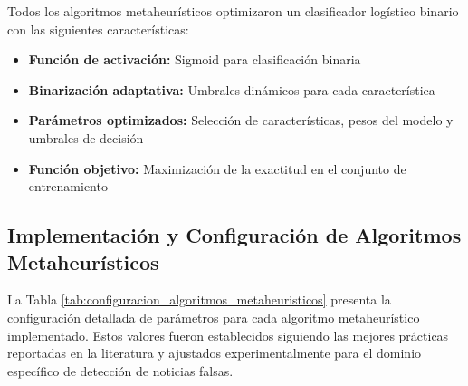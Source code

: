 Todos los algoritmos metaheurísticos optimizaron un clasificador logístico binario con las siguientes características:

\begin{itemize}
    \item \textbf{Función de activación:} Sigmoid para clasificación binaria
    \item \textbf{Binarización adaptativa:} Umbrales dinámicos para cada característica
    \item \textbf{Parámetros optimizados:} Selección de características, pesos del modelo y umbrales de decisión
    \item \textbf{Función objetivo:} Maximización de la exactitud en el conjunto de entrenamiento
\end{itemize}

\subsection{Implementación y Configuración de Algoritmos Metaheurísticos}
\label{subsec:implementacion_algoritmos}

La Tabla \ref{tab:configuracion_algoritmos_metaheuristicos} presenta la configuración detallada de parámetros para cada algoritmo metaheurístico implementado. Estos valores fueron establecidos siguiendo las mejores prácticas reportadas en la literatura y ajustados experimentalmente para el dominio específico de detección de noticias falsas.

